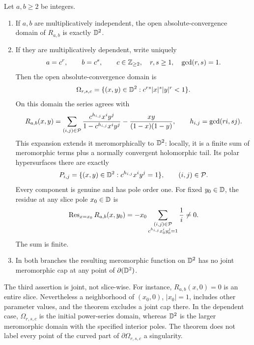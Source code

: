 \begin{theorem}\label{thm:classification}
Let \(a,b\geq2\) be integers.

\begin{enumerate}
\item If \(a,b\) are multiplicatively independent, the open
absolute-convergence domain of \(R_{a,b}\) is exactly \(\mathbb D^2\).

\item If they are multiplicatively dependent, write uniquely
\[
a=c^r,\qquad b=c^s,\qquad
c\in\mathbb Z_{\geq2},\quad r,s\geq1,\quad \gcd(r,s)=1.
\]
Then the open absolute-convergence domain is
\begin{equation}\label{eq:omega}
\Omega_{r,s,c}
=\{(x,y)\in\mathbb D^2:c^{rs}|x|^s|y|^r<1\}.
\end{equation}
On this domain the series agrees with
\begin{equation}\label{eq:meromorphic-expansion}
R_{a,b}(x,y)
=\sum_{(i,j)\in\mathcal P}
\frac{c^{h_{i,j}}x^iy^j}{1-c^{h_{i,j}}x^iy^j}
-\frac{xy}{(1-x)(1-y)},\qquad
h_{i,j}=\gcd(ri,sj).
\end{equation}
This expansion extends it meromorphically to \(\mathbb D^2\): locally, it
is a finite sum of meromorphic terms plus a normally convergent
holomorphic tail. Its polar hypersurfaces there are exactly
\begin{equation}\label{eq:polar-set}
P_{i,j}=\{(x,y)\in\mathbb D^2:c^{h_{i,j}}x^iy^j=1\},
\qquad (i,j)\in\mathcal P.
\end{equation}
Every component is genuine and has pole order one.
For fixed \(y_0\in\mathbb D\), the residue at any slice pole \(x_0\in\mathbb D\) is
\begin{equation}\label{eq:residue}
\operatorname{Res}_{x=x_0}R_{a,b}(x,y_0)
=-x_0
\sum_{\substack{(i,j)\in\mathcal P\\c^{h_{i,j}}x_0^iy_0^j=1}}\frac1i
\ne0.
\end{equation}
The sum is finite.

\item In both branches the resulting meromorphic function on \(\mathbb D^2\)
has no joint meromorphic cap at any point of \(\partial(\mathbb D^2)\).
\end{enumerate}
\end{theorem}

The third assertion is joint, not slice-wise. For instance,
\(R_{a,b}(x,0)=0\) is an entire slice. Nevertheless a neighborhood of
\((x_0,0)\), \(|x_0|=1\), includes other parameter values, and the
theorem excludes a joint cap there.
In the dependent case, \(\Omega_{r,s,c}\) is the initial power-series
domain, whereas \(\mathbb D^2\) is the larger meromorphic domain with the
specified interior poles. The theorem does not label every point of
the curved part of \(\partial\Omega_{r,s,c}\) a singularity.
